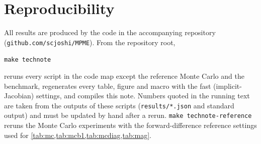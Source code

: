 \section{Reproducibility}\label{app:repro}

All results are produced by the code in the accompanying repository
(\texttt{github.com/scjoshi/MPME}). From the repository root,
\begin{center}
\texttt{make technote}
\end{center}
reruns every script in the code map except the reference Monte Carlo and the benchmark,
regenerates every table, figure and macro with the fast (implicit-Jacobian) settings, and
compiles this note. Numbers quoted in the running text are taken from the outputs of these
scripts (\texttt{results/*.json} and standard output) and must be updated by hand after a rerun.
\texttt{make technote-reference} reruns the Monte Carlo experiments with
the forward-difference reference settings used for \cref{tab:mc,tab:mcb1,tab:mcdiag,tab:mag}.

